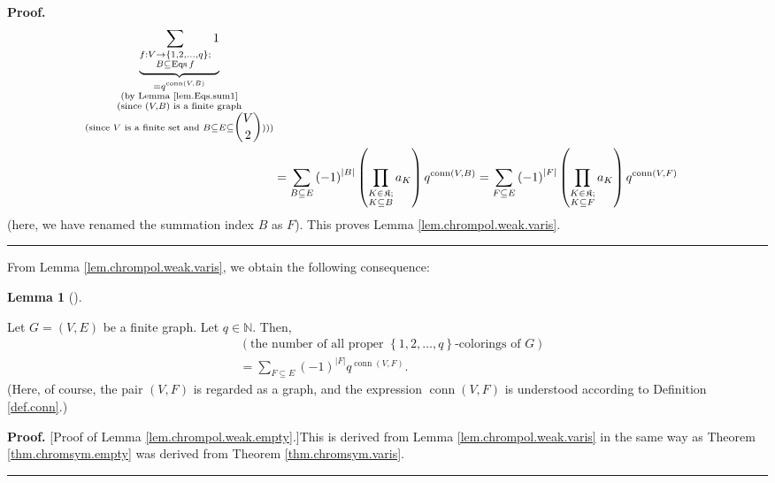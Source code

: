 \documentclass[numbers=enddot,12pt,final,onecolumn,notitlepage]{scrartcl}%
\theoremstyle{definition}
\newtheorem{lem}[theo]{Lemma}
\newenvironment{lemma}[1][]
{\begin{lem}[#1]\begin{leftbar}}
{\end{leftbar}\end{lem}}
\newenvironment{proof}[1][Proof]{\noindent\textbf{#1.} }{\ \rule{0.5em}{0.5em}}
\newenvironment{verlong}{}{}
\newenvironment{vershort}{}{}
\let\sumnonlimits\sum
\let\prodnonlimits\prod
\renewcommand{\sum}{\sumnonlimits\limits}
\renewcommand{\prod}{\prodnonlimits\limits}
\begin{document}
\begin{verlong}
\begin{proof}
\begin{align*}
\underbrace{\sum_{\substack{f:V\rightarrow\left\{  1,2,\ldots,q\right\}
;\\B\subseteq\operatorname*{Eqs}f}}1}_{\substack{=q^{\operatorname*{conn}%
\left(  V,B\right)  }\\\text{(by Lemma \ref{lem.Eqs.sum1}}\\\text{(since
}\left(  V,B\right)  \text{ is a finite graph}\\\text{(since }V\text{ is a
finite set and }B\subseteq E\subseteq\dbinom{V}{2}\text{)))}}}\\
&  =\sum_{B\subseteq E}\left(  -1\right)  ^{\left\vert B\right\vert }\left(
\prod_{\substack{K\in\mathfrak{K};\\K\subseteq B}}a_{K}\right)
q^{\operatorname*{conn}\left(  V,B\right)  }=\sum_{F\subseteq E}\left(
-1\right)  ^{\left\vert F\right\vert }\left(  \prod_{\substack{K\in
\mathfrak{K};\\K\subseteq F}}a_{K}\right)  q^{\operatorname*{conn}\left(
V,F\right)  }%
\end{align*}
(here, we have renamed the summation index $B$ as $F$). This proves Lemma
\ref{lem.chrompol.weak.varis}.
\end{proof}
\end{verlong}

From Lemma \ref{lem.chrompol.weak.varis}, we obtain the following consequence:

\begin{lemma}
\label{lem.chrompol.weak.empty}Let $G=\left(  V,E\right)  $ be a finite graph.
Let $q\in\mathbb{N}$. Then,%
\begin{align*}
&  \left(  \text{the number of all proper }\left\{  1,2,\ldots,q\right\}
\text{-colorings of }G\right) \\
&  =\sum_{F\subseteq E}\left(  -1\right)  ^{\left\vert F\right\vert
}q^{\operatorname*{conn}\left(  V,F\right)  }.
\end{align*}
(Here, of course, the pair $\left(  V,F\right)  $ is regarded as a graph, and
the expression $\operatorname*{conn}\left(  V,F\right)  $ is understood
according to Definition \ref{def.conn}.)
\end{lemma}

\begin{vershort}
\begin{proof}
[Proof of Lemma \ref{lem.chrompol.weak.empty}.]This is derived from Lemma
\ref{lem.chrompol.weak.varis} in the same way as Theorem
\ref{thm.chromsym.empty} was derived from Theorem \ref{thm.chromsym.varis}.
\end{proof}
\end{vershort}
\end{document}
